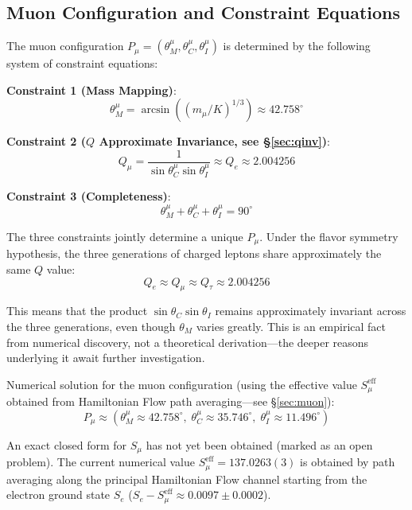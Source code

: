 \documentclass[aps,prd,reprint,nofootinbib]{revtex4-2}
\begin{document}
\subsection{Muon Configuration and Constraint Equations}

The muon configuration $P_\mu = (\theta_M^\mu, \theta_C^\mu, \theta_I^\mu)$ is determined by the following system of constraint equations:

\textbf{Constraint 1 (Mass Mapping)}:
\begin{equation}
\theta_M^\mu = \arcsin((m_\mu/K)^{1/3}) \approx 42.758^\circ \label{eq:c1}
\end{equation}

\textbf{Constraint 2 ($Q$ Approximate Invariance, see \S\ref{sec:qinv})}:
\begin{equation}
Q_\mu = \frac{1}{\sin\theta_C^\mu\sin\theta_I^\mu} \approx Q_e \approx 2.004256 \label{eq:c2}
\end{equation}

\textbf{Constraint 3 (Completeness)}:
\begin{equation}
\theta_M^\mu + \theta_C^\mu + \theta_I^\mu = 90^\circ \label{eq:c3}
\end{equation}

The three constraints jointly determine a unique $P_\mu$. Under the flavor symmetry hypothesis, the three generations of charged leptons share approximately the same $Q$ value:
\begin{equation}
Q_e \approx Q_\mu \approx Q_\tau \approx 2.004256 \label{eq:Qflavor}
\end{equation}

This means that the product $\sin\theta_C\sin\theta_I$ remains approximately invariant across the three generations, even though $\theta_M$ varies greatly. This is an empirical fact from numerical discovery, not a theoretical derivation---the deeper reasons underlying it await further investigation.

Numerical solution for the muon configuration (using the effective value $S_\mu^{\text{eff}}$ obtained from Hamiltonian Flow path averaging---see \S\ref{sec:muon}):
\begin{equation}
\boxed{P_\mu \approx (\theta_M^\mu \approx 42.758^\circ,\; \theta_C^\mu \approx 35.746^\circ,\; \theta_I^\mu \approx 11.496^\circ)} \label{eq:muon}
\end{equation}

An exact closed form for $S_\mu$ has not yet been obtained (marked as an open problem). The current numerical value $S_\mu^{\text{eff}} = 137.0263(3)$ is obtained by path averaging along the principal Hamiltonian Flow channel starting from the electron ground state $S_e$ ($S_e - S_\mu^{\text{eff}} \approx 0.0097 \pm 0.0002$).
\end{document}
